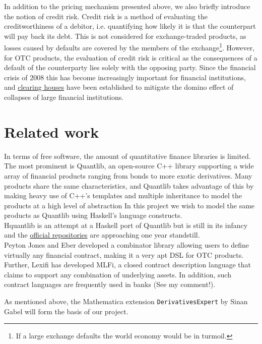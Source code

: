 In addition to the pricing mechanism presented above, we also briefly introduce
the notion of credit risk. Credit risk is a method of evaluating the creditworthiness
of a debitor, i.e. quantifying how likely it is that the counterpart will pay back 
its debt. This is not considered for exchange-traded products, as losses 
caused by defaults are covered by the members of the exchange\footnote{If a large 
exchange defaults the world economy would be in turmoil.}. However, for OTC
products, the evaluation of credit risk is critical as the consequences of a 
default of the counterparty lies solely with the opposing party. Since the 
financial crisis of 2008 this has become increasingly important for financial 
institutions, and \href{http://www.lchclearnet.com/}{clearing houses} have
been established to mitigate the 
domino effect of collapses of large financial institutions.


\section{Related work}

In terms of free software, the amount of quantitative finance libraries is 
limited.
The most prominent is Quantlib, an open-source C++ library\cite{Ame2003}
supporting a wide array of financial products ranging from bonds to more 
exotic derivatives. Many products share the same characteristics, and
Quantlib takes advantage of this by making heavy use of C++'s templates 
and multiple  inheritance to model the products at a high level of 
abstraction\cite{implql}
In this project we wish to model the same products as Quantlib using Haskell's
language constructs.\\

Hquantlib\cite{hquantlib} is an attempt at a Haskell port of Quantlib
but is still in its infancy and the
\href{https://github.com/paulrzcz/hquantlib/tree/master}{official repositories}
are approaching one year standstill.\\

Peyton Jones and Eber\cite{composingcontracts} developed a combinator library 
allowing users to define virtually any financial contract, making it a very
apt DSL for OTC products. Further, Lexifi has developed MLFi, a
closed contract description language that claims to support any combination of
underlying assets. In addition, such contract languages are frequently used in
banks (See my comment!). 

As mentioned above, the Mathematica extension
\texttt{DerivativesExpert}\cite{Mathematica:DerivativesExpert} by Sinan Gabel
will form the basis of our project.
